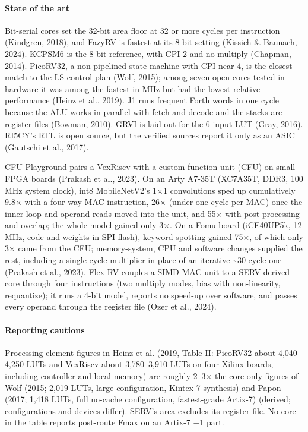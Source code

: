 \paragraph{State of the art} Bit-serial cores set the 32-bit area floor at 32 or more cycles per instruction (Kindgren, 2018), and FazyRV is fastest at its 8-bit setting (Kissich \& Baunach, 2024). KCPSM6 is the 8-bit reference, with CPI 2 and no multiply (Chapman, 2014). PicoRV32, a non-pipelined state machine with CPI near 4, is the closest match to the LS control plan (Wolf, 2015); among seven open cores tested in hardware it was among the fastest in MHz but had the lowest relative performance (Heinz et al., 2019). J1 runs frequent Forth words in one cycle because the ALU works in parallel with fetch and decode and the stacks are register files (Bowman, 2010). GRVI is laid out for the 6-input LUT (Gray, 2016). RI5CY's RTL is open source, but the verified sources report it only as an ASIC (Gautschi et al., 2017).

CFU Playground pairs a VexRiscv with a custom function unit (CFU) on small FPGA boards (Prakash et al., 2023). On an Arty A7-35T (XC7A35T, DDR3, 100 MHz system clock), int8 MobileNetV2's 1×1 convolutions sped up cumulatively 9.8× with a four-way MAC instruction, 26× (under one cycle per MAC) once the inner loop and operand reads moved into the unit, and 55× with post-processing and overlap; the whole model gained only 3×. On a Fomu board (iCE40UP5k, 12 MHz, code and weights in SPI flash), keyword spotting gained 75×, of which only 3× came from the CFU; memory-system, CPU and software changes supplied the rest, including a single-cycle multiplier in place of an iterative \textasciitilde{}30-cycle one (Prakash et al., 2023). Flex-RV couples a SIMD MAC unit to a SERV-derived core through four instructions (two multiply modes, bias with non-linearity, requantize); it runs a 4-bit model, reports no speed-up over software, and passes every operand through the register file (Ozer et al., 2024).

\paragraph{Reporting cautions} Processing-element figures in Heinz et al. (2019, Table II: PicoRV32 about 4,040–4,250 LUTs and VexRiscv about 3,780–3,910 LUTs on four Xilinx boards, including controller and local memory) are roughly 2–3× the core-only figures of Wolf (2015; 2,019 LUTs, large configuration, Kintex-7 synthesis) and Papon (2017; 1,418 LUTs, full no-cache configuration, fastest-grade Artix-7) (derived; configurations and devices differ). SERV's area excludes its register file. No core in the table reports post-route Fmax on an Artix-7 −1 part.

